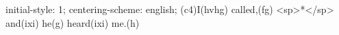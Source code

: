 initial-style: 1;
centering-scheme: english;
(c4)I(hvhg) called,(fg) <sp>*</sp> and(ixi) he(g) heard(ixi) me.(h)